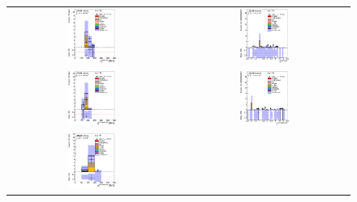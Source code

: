 \clearpage
\begin{figure}[htbp]
\begin{center}
\begin{tabular}{cc}
%
\includegraphics[width=0.30\textwidth]{appendices/figures/sdrs/JetPt1_ELEMUONCR7_1W_NOMINAL.eps} &
\includegraphics[width=0.30\textwidth]{appendices/figures/sdrs/JetEta1_ELEMUONCR7_1W_NOMINAL.eps} \\
\includegraphics[width=0.30\textwidth]{appendices/figures/sdrs/JetPt2_ELEMUONCR7_1W_NOMINAL.eps} &
\includegraphics[width=0.30\textwidth]{appendices/figures/sdrs/JetEta2_ELEMUONCR7_1W_NOMINAL.eps} \\
\includegraphics[width=0.30\textwidth]{appendices/figures/sdrs/JetPt3_ELEMUONCR7_1W_NOMINAL.eps} &

\end{tabular}
\end{center}
\end{figure}
